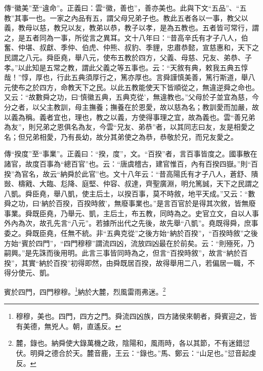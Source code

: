 {\noindent\zhuan{}\fzbyks 傳“徽美”至“違命”。正義曰：雲“徽，善也”，善亦美也。此與下文“五品”、“五教”其事一也。一家之內品有五，謂父母兄弟子也。教此五者各以一事，教父以義，教母以慈，教兄以友，教弟以恭，教子以孝，是為五教也。五者皆可常行，謂之，是五者同為一事，所從言之異耳。文十八年曰：“昔高辛氏有才子八人，伯奮、仲堪、叔獻、季仲、伯虎、仲熊、叔豹、季貍，忠肅恭懿，宣慈惠和，天下之民謂之八元。舜臣堯，舉八元，使布五教於四方，父義、母慈、兄友、弟恭、子孝。”以此知是五常之教，謂此父義之等五事也。云：“天敘有典，敕我五典五惇哉！”惇，厚也，行此五典須厚行之，篤亦厚也。言舜謹慎美善，篤行斯道，舉八元使布之於四方，命教天下之民。以此五教能使天下皆順從之，無違逆舜之命也。又云：“故數舜之功，曰‘慎徽五典，五典克從’，無違教也。”父母於子並宜為慈，今分之者，以父主教訓，母主撫養；撫養在於恩愛，故以慈為名；教訓愛而加嚴，故以義為稱。義者宜也，理也，教之以義，方使得事理之宜，故為義也。雲“善兄弟為友”，則兄弟之恩俱名為友，今雲“兄友、弟恭”者，以其同志曰友，友是相愛之名；但兄弟相愛，乃有長幼，故分其弟使之為恭，恭敬於兄，而兄友愛之。 \par}

{\noindent\zhuan{}\fzbyks 傳“揆度”至“事業”。正義曰：“揆，度”，文。“百揆”者，言百事皆度之。國事散在諸官，故度百事為“總百官”也。云：“唐虞稽古，建官惟百，內有百揆四嶽。”則“百揆”為官名，故云“納舜於此官”也。文十八年云：“昔高陽氏有才子八人，蒼舒、隤敱、檮戭、大臨、尨降、庭堅、仲容、叔達，齊聖廣淵，明允篤誠，天下之民謂之八凱。舜臣堯，舉八凱，使主后土，以揆百事，莫不時敘，地平天成。”又云：“數舜之功，曰‘納於百揆，百揆時敘’，無廢事業也。”是言百官於是得其次敘，皆無廢事業。舜既臣堯，乃舉元、凱，主后土，布五教，同時為之。史官立文，自以人事外內為次，故孔先言“八元”。若據所出代之先後，故先舉“八凱”。堯既得舜，庶事委之。舜既臣堯，任無不統。非“五典克從”之後方始“納於百揆”，“百揆時敘”之後方始“賓於四門”，“四門穆穆”謂流四凶，流放四凶最在於前矣。云：“則殛死，乃嗣興。”是先誅而後用明。此言三事皆同時為之，但言“百揆時敘”，故言“納於百揆”，其實“納於百揆”初得即然，由舜既居百揆，故得舉用二八，若偏居一職，不得分使元、凱。 \par}

賓於四門，四門穆穆。\footnote{穆穆，美也。四門，四方之門。舜流四凶族，四方諸侯來朝者，舜賓迎之，皆有美德，無兇人。朝，直遙反。}納於大麓，烈風雷雨弗迷。\footnote{麓，錄也。納舜使大錄萬機之政，陰陽和，風雨時，各以其節，不有迷錯愆伏。明舜之德合於天。麓音鹿，王云：“錄也。”馬、鄭云：“山足也。”愆音起虔反。}

